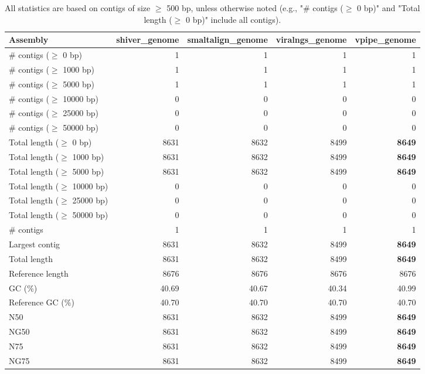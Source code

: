 \documentclass[12pt,a4paper]{article}
\begin{document}
\begin{table}[ht]
\begin{center}
\caption{All statistics are based on contigs of size $\geq$ 500 bp, unless otherwise noted (e.g., "\# contigs ($\geq$ 0 bp)" and "Total length ($\geq$ 0 bp)" include all contigs).}
\begin{tabular}{|l*{4}{|r}|}
\hline
Assembly & shiver\_genome & smaltalign\_genome & viralngs\_genome & vpipe\_genome \\ \hline
\# contigs ($\geq$ 0 bp) & 1 & 1 & 1 & 1 \\ \hline
\# contigs ($\geq$ 1000 bp) & 1 & 1 & 1 & 1 \\ \hline
\# contigs ($\geq$ 5000 bp) & 1 & 1 & 1 & 1 \\ \hline
\# contigs ($\geq$ 10000 bp) & 0 & 0 & 0 & 0 \\ \hline
\# contigs ($\geq$ 25000 bp) & 0 & 0 & 0 & 0 \\ \hline
\# contigs ($\geq$ 50000 bp) & 0 & 0 & 0 & 0 \\ \hline
Total length ($\geq$ 0 bp) & 8631 & 8632 & 8499 & {\bf 8649} \\ \hline
Total length ($\geq$ 1000 bp) & 8631 & 8632 & 8499 & {\bf 8649} \\ \hline
Total length ($\geq$ 5000 bp) & 8631 & 8632 & 8499 & {\bf 8649} \\ \hline
Total length ($\geq$ 10000 bp) & 0 & 0 & 0 & 0 \\ \hline
Total length ($\geq$ 25000 bp) & 0 & 0 & 0 & 0 \\ \hline
Total length ($\geq$ 50000 bp) & 0 & 0 & 0 & 0 \\ \hline
\# contigs & 1 & 1 & 1 & 1 \\ \hline
Largest contig & 8631 & 8632 & 8499 & {\bf 8649} \\ \hline
Total length & 8631 & 8632 & 8499 & {\bf 8649} \\ \hline
Reference length & 8676 & 8676 & 8676 & 8676 \\ \hline
GC (\%) & 40.69 & 40.67 & 40.34 & 40.99 \\ \hline
Reference GC (\%) & 40.70 & 40.70 & 40.70 & 40.70 \\ \hline
N50 & 8631 & 8632 & 8499 & {\bf 8649} \\ \hline
NG50 & 8631 & 8632 & 8499 & {\bf 8649} \\ \hline
N75 & 8631 & 8632 & 8499 & {\bf 8649} \\ \hline
NG75 & 8631 & 8632 & 8499 & {\bf 8649} \\ \hline

\end{tabular}
\end{center}
\end{table}
\end{document}
